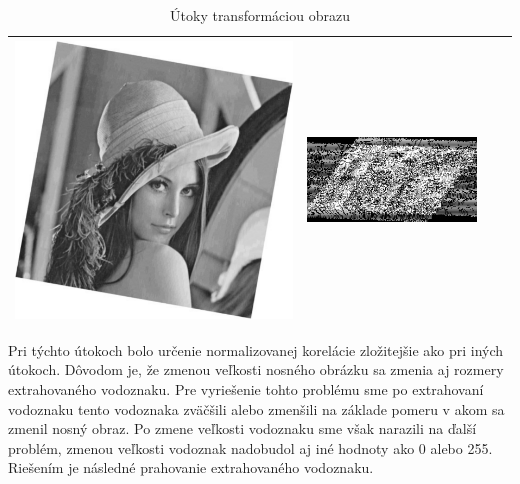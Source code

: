 \begin{table}[h]
\begin{tabular}{llcc}
\begin{minipage}[c]{.1\textwidth}
  \includegraphics[scale=0.1]{obrazky/rotation10}
\end{minipage}
 &
 \begin{minipage}[c]{.15\textwidth}
   \includegraphics[scale=0.25]{obrazky/rotation10-wm}
 \end{minipage} \\ \hline
\end{tabular}
\caption{Útoky transformáciou obrazu}
\end{table}

Pri týchto útokoch bolo určenie normalizovanej korelácie zložitejšie ako pri iných útokoch. Dôvodom je, že zmenou veľkosti nosného obrázku sa zmenia aj rozmery extrahovaného vodoznaku. Pre vyriešenie tohto problému sme po extrahovaní vodoznaku tento vodoznaka zväčšili alebo zmenšili na základe pomeru v akom sa zmenil nosný obraz. Po zmene veľkosti vodoznaku sme však narazili na ďalší problém, zmenou veľkosti vodoznak nadobudol aj iné hodnoty ako 0 alebo 255. Riešením je následné prahovanie extrahovaného vodoznaku.

